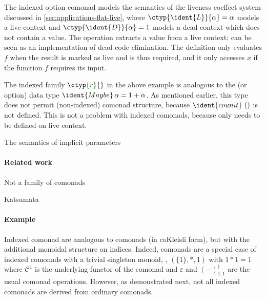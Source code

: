 \noindent
The indexed option comonad models the semantics of the liveness coeffect system discussed in 
\ref{sec:applications-flat-live}, where $\ctyp{\ident{L}}{\alpha} = \alpha$ models a live context 
and $\ctyp{\ident{D}}{\alpha}=1$ models a dead context which does not contain a value. The 
operation extracts a value from a live context;  can be seen as an implementation of 
dead code elimination. The definition only evaluates $f$ when the result is marked as live and is thus
required, and it only accesses $x$ if the function $f$ requires its input.

The indexed family $\ctyp{\cclrd{r}}{}$ in the above example is analogous to the 
(or option) data type $\ident{Maybe}\,\alpha = 1 + \alpha$. As mentioned earlier, this type does not 
permit (non-indexed) comonad structure, because $\ident{counit}~()$ is not defined. This is not a 
problem with indexed comonads, because  only needs to be defined on live context.

\begin{example}
The semantics of implicit parameters

\end{example}




\paragraph{Related work}

Not a family of comonads

Katsumata

\newcommand{\ccat}[0]{\mathcal{C}}
\newcommand{\cobind}[2]{#1^\dagger_{#2}}
\newcommand{\cmerge}[0]{ \ident{m} }
\newcommand{\csplit}[0]{ \ident{n} }
\newcommand{\counit}[0]{ \varepsilon }

\paragraph{Example}
Indexed comonad are analogous to comonads (in coKleisli form), but
with the additional monoidal structure on indices.  Indeed, comonads
are a special case of indexed comonads with a trivial singleton
monoid, \eg{}, $(\{1\}, \ast, 1)$ with $1 \ast 1 = 1$ where $\ccat^1$
is the underlying functor of the comonad and $\counit$ and
$\cobind{(-)}{1, 1}$ are the usual comonad operations.
However, as demonstrated next, not all indexed comonads are derived from ordinary comonads.

